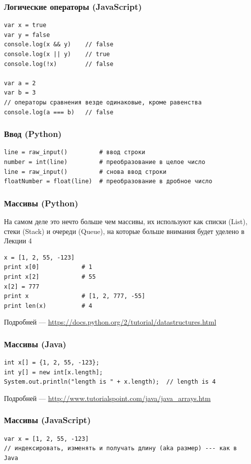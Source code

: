 {\begin{frame}[fragile]
  \frametitle{Логические операторы (JavaScript)}
  \begin{verbatim}
var x = true
var y = false
console.log(x && y)    // false
console.log(x || y)    // true
console.log(!x)        // false

var a = 2
var b = 3
// операторы сравнения везде одинаковые, кроме равенства
console.log(a === b)   // false
  \end{verbatim}
\end{frame}

\begin{frame}[fragile]
  \frametitle{Ввод (Python)}
  \begin{verbatim}
line = raw_input()         # ввод строки
number = int(line)         # преобразование в целое число
line = raw_input()         # снова ввод строки
floatNumber = float(line)  # преобразование в дробное число
  \end{verbatim}
\end{frame}

\begin{frame}[fragile]
  \frametitle{Массивы (Python)}
  На самом деле это нечто больше чем массивы, их используют как списки (List), стеки (Stack)
  и очереди (Queue), на которые больше внимания будет уделено в Лекции 4
  \vspace{0.5cm}
  \begin{verbatim}
x = [1, 2, 55, -123]
print x[0]            # 1
print x[2]            # 55
x[2] = 777
print x               # [1, 2, 777, -55]
print len(x)          # 4
  \end{verbatim}

  \vspace{0.5cm}
  Подробней --- \url{https://docs.python.org/2/tutorial/datastructures.html}
\end{frame}

\begin{frame}[fragile]
  \frametitle{Массивы (Java)}
  \begin{verbatim}
int x[] = {1, 2, 55, -123};
int y[] = new int[x.length];
System.out.println("length is " + x.length);  // length is 4
  \end{verbatim}

  \vspace{0.5cm}
  Подробней --- \url{http://www.tutorialspoint.com/java/java\_arrays.htm}
\end{frame}

\begin{frame}[fragile]
  \frametitle{Массивы (JavaScript)}
  \begin{verbatim}
var x = [1, 2, 55, -123]
// индексировать, изменять и получать длину (aka размер) --- как в Java
  \end{verbatim}


\end{frame}}
